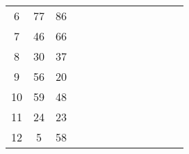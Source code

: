 \begin{table}[tb]
\begin{tabular}{ccccccccccccc}
		\multicolumn{1}{|c|}{6}  & \multicolumn{1}{c|}{77} & \multicolumn{1}{c|}{86} &                         &                         &                         &                         &                         &                         &                         &                         &                         &                         \\ \cline{1-3}
		\multicolumn{1}{|c|}{7}  & \multicolumn{1}{c|}{46} & \multicolumn{1}{c|}{66} &                         &                         &                         &                         &                         &                         &                         &                         &                         &                         \\ \cline{1-3}
		\multicolumn{1}{|c|}{8}  & \multicolumn{1}{c|}{30} & \multicolumn{1}{c|}{37} &                         &                         &                         &                         &                         &                         &                         &                         &                         &                         \\ \cline{1-3}
		\multicolumn{1}{|c|}{9}  & \multicolumn{1}{c|}{56} & \multicolumn{1}{c|}{20} &                         &                         &                         &                         &                         &                         &                         &                         &                         &                         \\ \cline{1-3}
		\multicolumn{1}{|c|}{10} & \multicolumn{1}{c|}{59} & \multicolumn{1}{c|}{48} &                         &                         &                         &                         &                         &                         &                         &                         &                         &                         \\ \cline{1-3}
		\multicolumn{1}{|c|}{11} & \multicolumn{1}{c|}{24} & \multicolumn{1}{c|}{23} &                         &                         &                         &                         &                         &                         &                         &                         &                         &                         \\ \cline{1-3}
		\multicolumn{1}{|c|}{12} & \multicolumn{1}{c|}{5}  & \multicolumn{1}{c|}{58} &                         &                         &                         &                         &                         &                         &                         &                         &                         &                         \\ \cline{1-3}

\end{tabular}
\end{table}
